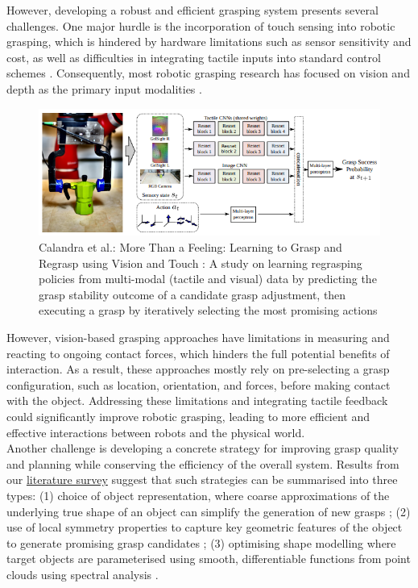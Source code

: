 \documentclass[11pt, a4paper]{report}
\begin{document}
However, developing a robust and efficient grasping system presents several challenges. One major hurdle is the incorporation of touch sensing into robotic grasping, which is hindered by hardware limitations such as sensor sensitivity and cost, as well as difficulties in integrating tactile inputs into standard control schemes \cite{Calandra_2018}. Consequently, most robotic grasping research has focused on vision and depth as the primary input modalities \cite{Calandra_2018, de_Farias_2021}.
\begin{figure}[ht]
    \centering
    \includegraphics[width=\textwidth]{docs/Project Report/Media/calandra_2018_model.png}
    \caption{Calandra et al.: More Than a Feeling: Learning to Grasp and Regrasp using Vision and Touch \cite{Calandra_2018}: A study on learning regrasping policies from multi-modal (tactile and visual) data by predicting the grasp stability outcome of a candidate grasp adjustment, then executing a grasp by iteratively selecting the most promising actions}
    \label{fig:1.2}
\end{figure}

However, vision-based grasping approaches have limitations in measuring and reacting to ongoing contact forces, which hinders the full potential benefits of interaction. As a result, these approaches mostly rely on pre-selecting a grasp configuration, such as location, orientation, and forces, before making contact with the object. Addressing these limitations and integrating tactile feedback could significantly improve robotic grasping, leading to more efficient and effective interactions between robots and the physical world.\\

Another challenge is developing a concrete strategy for improving grasp quality and planning while conserving the efficiency of the overall system. Results from our \hyperref[chap:2]{literature survey} suggest that such strategies can be summarised into three types: (1) choice of object representation, where coarse approximations of the underlying true shape of an object can simplify the generation of new grasps \cite{de_Farias_2021} \cite{geidenstam_2009}; (2) use of local symmetry properties to capture key geometric features of the object to generate promising grasp candidates \cite{de_Farias_2021}; (3) optimising shape modelling where target objects are parameterised using smooth, differentiable functions from point clouds using spectral analysis \cite{de_Farias_2021}.
\end{document}
